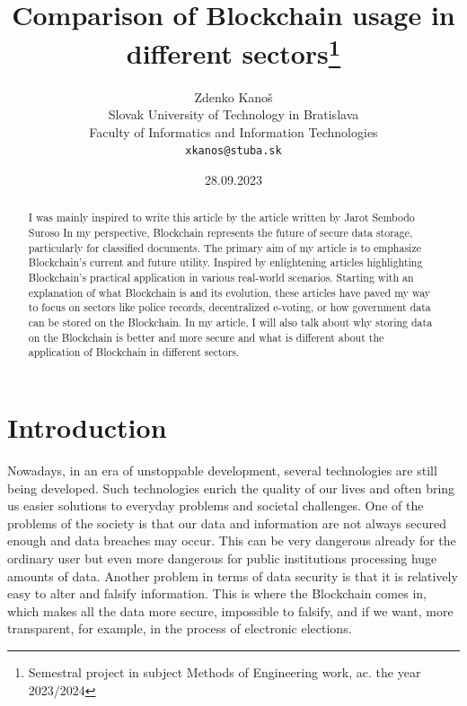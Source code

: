 \documentclass[10pt,english,a4paper]{article}
\title{Comparison of Blockchain usage in different sectors\centering\thanks{Semestral project in subject Methods of Engineering work, ac. the year 2023/2024}}
\author{Zdenko Kanoš\\[2pt]
	{\small Slovak University of Technology in Bratislava}\\
	{\small Faculty of Informatics and Information Technologies}\\
	{\small \texttt{xkanos@stuba.sk}}
	}
\date{\small 28.09.2023}
\begin{document}
\maketitle

\begin{abstract}
I was mainly inspired to write this article by the article written by Jarot Sembodo Suroso\cite{Suroso:SKCK} In my perspective, Blockchain represents the future of secure data storage, particularly for classified documents. The primary aim of my article is to emphasize Blockchain’s current and future utility. Inspired by enlightening articles highlighting Blockchain's practical application in various real-world scenarios. Starting with an explanation of what Blockchain is and its evolution, these articles have paved my way to focus on sectors like police records, decentralized e-voting, or how government data can be stored on the Blockchain. In my article, I will also talk about why storing data on the Blockchain is better and more secure and what is different about the application of Blockchain in different sectors.
\end{abstract}

\section{Introduction}
Nowadays, in an era of unstoppable development, several technologies are still being developed. Such technologies enrich the quality of our lives and often bring us easier solutions to everyday problems and societal challenges. One of the problems of the society is that our data and information are not always secured enough and data breaches may occur. This can be very dangerous already for the ordinary user but even more dangerous for public institutions processing huge amounts of data. Another problem in terms of data security is that it is relatively easy to alter and falsify information.  This is where the Blockchain comes in, which makes all the data more secure, impossible to falsify, and if we want, more transparent, for example, in the process of electronic elections.
\newpage
\end{document}
